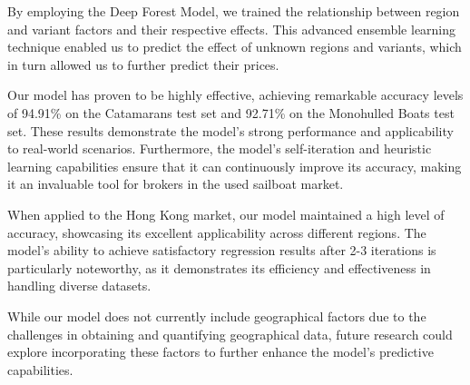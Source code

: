 \documentclass[12pt]{article}  %
\begin{document}
By employing the Deep Forest Model, we trained the relationship between region and variant factors and their respective effects. This advanced ensemble learning technique enabled us to predict the effect of unknown regions and variants, which in turn allowed us to further predict their prices.

Our model has proven to be highly effective, achieving remarkable accuracy levels of 94.91\% on the Catamarans test set and 92.71\% on the Monohulled Boats test set. These results demonstrate the model's strong performance and applicability to real-world scenarios. Furthermore, the model's self-iteration and heuristic learning capabilities ensure that it can continuously improve its accuracy, making it an invaluable tool for brokers in the used sailboat market.

When applied to the Hong Kong market, our model maintained a high level of accuracy, showcasing its excellent applicability across different regions. The model's ability to achieve satisfactory regression results after 2-3 iterations is particularly noteworthy, as it demonstrates its efficiency and effectiveness in handling diverse datasets.

While our model does not currently include geographical factors due to the challenges in obtaining and quantifying geographical data, future research could explore incorporating these factors to further enhance the model's predictive capabilities.
\end{document}
